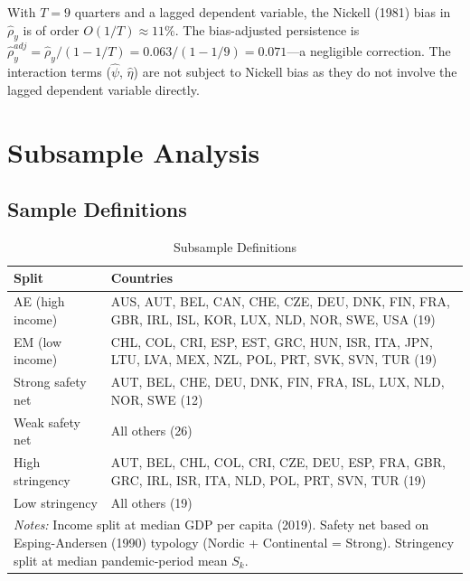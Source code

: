 \documentclass[12pt, a4paper]{article}
\begin{document}
With $T = 9$ quarters and a lagged dependent variable, the Nickell (1981) bias in $\hat{\rho}_y$ is of order $O(1/T) \approx 11\%$. The bias-adjusted persistence is $\hat{\rho}_y^{adj} = \hat{\rho}_y / (1 - 1/T) = 0.063 / (1 - 1/9) = 0.071$---a negligible correction. The interaction terms ($\hat{\psi}$, $\hat{\eta}$) are not subject to Nickell bias as they do not involve the lagged dependent variable directly.


\section{Subsample Analysis}
\label{app:subsamples}

\subsection{Sample Definitions}

\begin{table}[htbp]
\centering
\caption{Subsample Definitions}
\label{tab:subsample_def}
\small
\begin{tabular}{lp{10cm}}
\toprule
\textbf{Split} & \textbf{Countries} \\
\midrule
AE (high income) & AUS, AUT, BEL, CAN, CHE, CZE, DEU, DNK, FIN, FRA, GBR, IRL, ISL, KOR, LUX, NLD, NOR, SWE, USA (19) \\[3pt]
EM (low income) & CHL, COL, CRI, ESP, EST, GRC, HUN, ISR, ITA, JPN, LTU, LVA, MEX, NZL, POL, PRT, SVK, SVN, TUR (19) \\[3pt]
Strong safety net & AUT, BEL, CHE, DEU, DNK, FIN, FRA, ISL, LUX, NLD, NOR, SWE (12) \\[3pt]
Weak safety net & All others (26) \\[3pt]
High stringency & AUT, BEL, CHL, COL, CRI, CZE, DEU, ESP, FRA, GBR, GRC, IRL, ISR, ITA, NLD, POL, PRT, SVN, TUR (19) \\[3pt]
Low stringency & All others (19) \\
\bottomrule
\multicolumn{2}{p{13cm}}{\footnotesize \textit{Notes:} Income split at median GDP per capita (2019). Safety net based on Esping-Andersen (1990) typology (Nordic + Continental = Strong). Stringency split at median pandemic-period mean $S_k$.} \\
\end{tabular}
\end{table}
\end{document}
